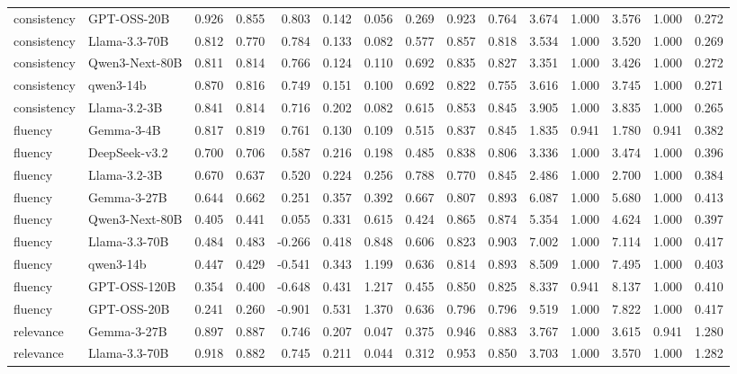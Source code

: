 \begin{table}[t]
{\begin{tabular}{llrrrrrrrrrrrrr}
consistency & GPT-OSS-20B & 0.926 & 0.855 & 0.803 & 0.142 & 0.056 & 0.269 & 0.923 & 0.764 & 3.674 & 1.000 & 3.576 & 1.000 & 0.272 \\
consistency & Llama-3.3-70B & 0.812 & 0.770 & 0.784 & 0.133 & 0.082 & 0.577 & 0.857 & 0.818 & 3.534 & 1.000 & 3.520 & 1.000 & 0.269 \\
consistency & Qwen3-Next-80B & 0.811 & 0.814 & 0.766 & 0.124 & 0.110 & 0.692 & 0.835 & 0.827 & 3.351 & 1.000 & 3.426 & 1.000 & 0.272 \\
consistency & qwen3-14b & 0.870 & 0.816 & 0.749 & 0.151 & 0.100 & 0.692 & 0.822 & 0.755 & 3.616 & 1.000 & 3.745 & 1.000 & 0.271 \\
consistency & Llama-3.2-3B & 0.841 & 0.814 & 0.716 & 0.202 & 0.082 & 0.615 & 0.853 & 0.845 & 3.905 & 1.000 & 3.835 & 1.000 & 0.265 \\
fluency & Gemma-3-4B & 0.817 & 0.819 & 0.761 & 0.130 & 0.109 & 0.515 & 0.837 & 0.845 & 1.835 & 0.941 & 1.780 & 0.941 & 0.382 \\
fluency & DeepSeek-v3.2 & 0.700 & 0.706 & 0.587 & 0.216 & 0.198 & 0.485 & 0.838 & 0.806 & 3.336 & 1.000 & 3.474 & 1.000 & 0.396 \\
fluency & Llama-3.2-3B & 0.670 & 0.637 & 0.520 & 0.224 & 0.256 & 0.788 & 0.770 & 0.845 & 2.486 & 1.000 & 2.700 & 1.000 & 0.384 \\
fluency & Gemma-3-27B & 0.644 & 0.662 & 0.251 & 0.357 & 0.392 & 0.667 & 0.807 & 0.893 & 6.087 & 1.000 & 5.680 & 1.000 & 0.413 \\
fluency & Qwen3-Next-80B & 0.405 & 0.441 & 0.055 & 0.331 & 0.615 & 0.424 & 0.865 & 0.874 & 5.354 & 1.000 & 4.624 & 1.000 & 0.397 \\
fluency & Llama-3.3-70B & 0.484 & 0.483 & -0.266 & 0.418 & 0.848 & 0.606 & 0.823 & 0.903 & 7.002 & 1.000 & 7.114 & 1.000 & 0.417 \\
fluency & qwen3-14b & 0.447 & 0.429 & -0.541 & 0.343 & 1.199 & 0.636 & 0.814 & 0.893 & 8.509 & 1.000 & 7.495 & 1.000 & 0.403 \\
fluency & GPT-OSS-120B & 0.354 & 0.400 & -0.648 & 0.431 & 1.217 & 0.455 & 0.850 & 0.825 & 8.337 & 0.941 & 8.137 & 1.000 & 0.410 \\
fluency & GPT-OSS-20B & 0.241 & 0.260 & -0.901 & 0.531 & 1.370 & 0.636 & 0.796 & 0.796 & 9.519 & 1.000 & 7.822 & 1.000 & 0.417 \\
relevance & Gemma-3-27B & 0.897 & 0.887 & 0.746 & 0.207 & 0.047 & 0.375 & 0.946 & 0.883 & 3.767 & 1.000 & 3.615 & 0.941 & 1.280 \\
relevance & Llama-3.3-70B & 0.918 & 0.882 & 0.745 & 0.211 & 0.044 & 0.312 & 0.953 & 0.850 & 3.703 & 1.000 & 3.570 & 1.000 & 1.282 \\

\end{tabular}}
\end{table}
